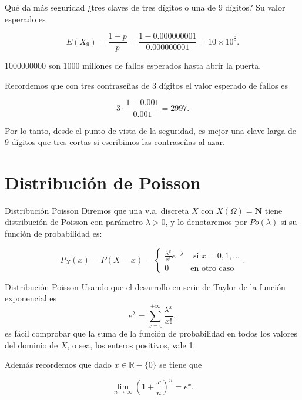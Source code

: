 \documentclass[
  ignorenonframetext,
  aspectratio=169]{beamer}
\begin{document}
\begin{frame}{Qué da más seguridad ¿tres claves de tres dígitos o una de
9 dígitos?}
\protect\hypertarget{quuxe9-da-muxe1s-seguridad-tres-claves-de-tres-duxedgitos-o-una-de-9-duxedgitos}{}
Su valor esperado es

\[
E(X_9)=\frac{1-p}{p}=\frac{1-0.000000001}{0.000000001}=\ensuremath{10\times 10^{8}}.
\]

\(1000 000 000\) son 1000 millones de fallos esperados hasta abrir la
puerta.

Recordemos que con tres contraseñas de 3 dígitos el valor esperado de
fallos es

\[3\cdot \frac{1-0.001}{0.001}=2997.\]

Por lo tanto, desde el punto de vista de la seguridad, es mejor una
clave larga de 9 dígitos que tres cortas si escribimos las contraseñas
al azar.
\end{frame}

\hypertarget{distribuciuxf3n-de-poisson}{%
\section{Distribución de Poisson}\label{distribuciuxf3n-de-poisson}}

\begin{frame}{Distribución Poisson}
\protect\hypertarget{distribuciuxf3n-poisson}{}
Diremos que una v.a. discreta \(X\) con \(X(\Omega)=\mathbf{N}\) tiene
distribución de Poisson con parámetro \(\lambda>0\), y lo denotaremos
por \(Po(\lambda)\) si su función de probabilidad es:

\[
P_{X}(x)=P(X=x)=
\left\{\begin{array}{ll}
\frac{\lambda^x}{x!} e^{-\lambda}& \mbox{ si } x=0,1,\ldots\\
0 & \mbox{en otro caso}\end{array}\right..
\]
\end{frame}

\begin{frame}{Distribución Poisson}
\protect\hypertarget{distribuciuxf3n-poisson-1}{}
Usando que el desarrollo en serie de Taylor de la función exponencial es
\[
e^{\lambda}=\sum_{x=0}^{+\infty} \frac{\lambda^x}{x!},
\] es fácil comprobar que la suma de la función de probabilidad en todos
los valores del dominio de \(X\), o sea, los enteros positivos, vale 1.

Además recordemos que dado \(x\in\mathbb{R}-\{0\}\) se tiene que

\[
\lim_{n\to\infty} \left(1+\frac{x}{n}\right)^n=e^x.
\]
\end{frame}
\end{document}
